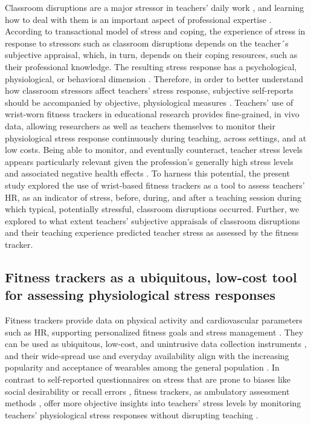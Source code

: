 \documentclass[preprint,
3p]{elsarticle} %
\begin{document}
Classroom disruptions are a major stressor in teachers' daily work
\citep{boyle1995structural, aloe2014multivariate}, and learning how to
deal with them is an important aspect of professional expertise
\citep{wolff2015keeping}. According to \citet{lazarus1990theory}
transactional model of stress and coping, the experience of stress in
response to stressors such as classroom disruptions depends on the
teacher´s subjective appraisal, which, in turn, depends on their coping
resources, such as their professional knowledge. The resulting stress
response has a psychological, physiological, or behavioral dimension
\citep{kyriacou1978}. Therefore, in order to better understand how
classroom stressors affect teachers' stress response, subjective
self-reports should be accompanied by objective, physiological measures
\citep{wettstein2021}. Teachers' use of wrist-worn fitness trackers in
educational research provides fine-grained, in vivo data, allowing
researchers as well as teachers themselves to monitor their
physiological stress response continuously during teaching, across
settings, and at low costs. Being able to monitor, and eventually
counteract, teacher stress levels appears particularly relevant given
the profession's generally high stress levels and associated negative
health effects \citep{johnson2005experience, montgomery2005meta}. To
harness this potential, the present study explored the use of
wrist-based fitness trackers as a tool to assess teachers' HR, as an
indicator of stress, before, during, and after a teaching session during
which typical, potentially stressful, classroom disruptions occurred.
Further, we explored to what extent teachers' subjective appraisals of
classroom disruptions and their teaching experience predicted teacher
stress as assessed by the fitness tracker.

\subsection{Fitness trackers as a ubiquitous, low-cost tool for
assessing physiological stress
responses}\label{fitness-trackers-as-a-ubiquitous-low-cost-tool-for-assessing-physiological-stress-responses}

Fitness trackers provide data on physical activity and cardiovascular
parameters such as HR, supporting personalized fitness goals
\citep{nuss2021effects} and stress management \citep{hao2018chrv}. They
can be used as ubiquitous, low-cost, and unintrusive data collection
instruments \citep{godfrey2018z}, and their wide-spread use and everyday
availability align with the increasing popularity and acceptance of
wearables among the general population \citep{peng2022acceptance}. In
contrast to self-reported questionnaires on stress
\citep{chaplain2008, liu2020} that are prone to biases like social
desirability \citep{razavi2001self} or recall errors
\citep{van2016accuracy}, fitness trackers, as ambulatory assessment
methods \citep{trull2013ambulatory, wettstein2020ambulatory}, offer more
objective insights into teachers' stress levels by monitoring teachers'
physiological stress responses without disrupting teaching
\citep{donker2018, runge2020}.
\end{document}
